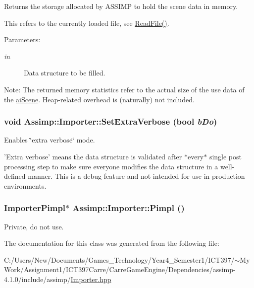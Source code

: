 Returns the storage allocated by ASSIMP to hold the scene data in memory.

This refers to the currently loaded file, see \hyperlink{class_assimp_1_1_importer_174418ab41d5b8bc51a044895cb991e5}{ReadFile()}. \begin{Desc}
\item[Parameters:]
\begin{description}
\item[{\em in}]Data structure to be filled. \end{description}
\end{Desc}
\begin{Desc}
\item[Note:]The returned memory statistics refer to the actual size of the use data of the \hyperlink{structai_scene}{aiScene}. Heap-related overhead is (naturally) not included. \end{Desc}
\hypertarget{class_assimp_1_1_importer_9bb793072c84c784279d0f6e870bb42d}{
\subsubsection[SetExtraVerbose]{\setlength{\rightskip}{0pt plus 5cm}void Assimp::Importer::SetExtraVerbose (bool {\em bDo})}}
\label{class_assimp_1_1_importer_9bb793072c84c784279d0f6e870bb42d}


Enables \char`\"{}extra verbose\char`\"{} mode.

'Extra verbose' means the data structure is validated after $\ast$every$\ast$ single post processing step to make sure everyone modifies the data structure in a well-defined manner. This is a debug feature and not intended for use in production environments. \hypertarget{class_assimp_1_1_importer_c112839f323a630f83395acb74746827}{
\subsubsection[Pimpl]{\setlength{\rightskip}{0pt plus 5cm}ImporterPimpl$\ast$ Assimp::Importer::Pimpl ()}}
\label{class_assimp_1_1_importer_c112839f323a630f83395acb74746827}


Private, do not use. 

The documentation for this class was generated from the following file:\begin{CompactItemize}
\item 
C:/Users/New/Documents/Games\_\-Technology/Year4\_\-Semester1/ICT397/$\sim$My Work/Assignment1/ICT397Carre/CarreGameEngine/Dependencies/assimp-4.1.0/include/assimp/\hyperlink{_importer_8hpp}{Importer.hpp}\end{CompactItemize}
